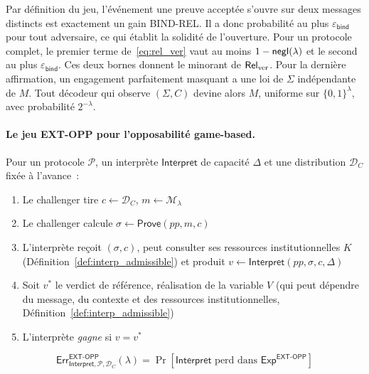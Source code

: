 \begin{sloppypar}
\begin{Preuve}
Par d\'efinition du jeu, l'\'ev\'enement \og une preuve accept\'ee s'ouvre sur deux
messages distincts\fg{} est exactement un gain BIND-REL. Il a donc probabilit\'e
au plus $\varepsilon_{\mathsf{bind}}$ pour tout adversaire, ce qui \'etablit la
solidit\'e de l'ouverture. Pour un protocole complet, le premier terme
de~\eqref{eq:rel_ver} vaut au moins $1 - \mathsf{negl}(\lambda)$ et le second au plus
$\varepsilon_{\mathsf{bind}}$. Ces deux bornes donnent le minorant de $\mathsf{Rel}_{\mathrm{ver}}$. Pour la derni\`ere affirmation, un
engagement parfaitement masquant a une loi de $\Sigma$ ind\'ependante de $M$.
Tout d\'ecodeur qui observe $(\Sigma,C)$ devine alors $M$, uniforme sur
$\{0,1\}^\lambda$, avec probabilit\'e $2^{-\lambda}$.
\end{Preuve}

\paragraph{Le jeu EXT-OPP pour l'opposabilit\'e game-based.}
\label{subsubsubsec:jeu_ext_opp}

\begin{definition}\label{def:jeu_ext_opp}
Pour un protocole $\mathcal{P}$, un interpr\`ete $\mathsf{Interpret}$
de capacit\'e $\Delta$ et une distribution $\mathcal{D}_C$ fix\'ee \`a l'avance~:
\begin{enumerate}
\item Le challenger tire $c \leftarrow \mathcal{D}_C$,
      $m \leftarrow \mathcal{M}_\lambda$
\item Le challenger calcule $\sigma \leftarrow \mathsf{Prove}(pp,m,c)$
\item L'interpr\`ete re\c{c}oit $(\sigma,c)$, peut consulter ses ressources
      institutionnelles $K$ (D\'efinition~\ref{def:interp_admissible}) et produit
      $v \leftarrow \mathsf{Interpret}(pp,\sigma,c,\Delta)$
\item Soit $v^*$ le verdict de r\'ef\'erence, r\'ealisation de la variable $V$
      (qui peut d\'ependre du message, du contexte et des ressources
      institutionnelles, D\'efinition~\ref{def:interp_admissible})
\item L'interpr\`ete \emph{gagne} si $v = v^*$
\end{enumerate}
\begin{equation}
\mathsf{Err}^{\mathsf{EXT\text{-}OPP}}_{\mathsf{Interpret},\mathcal{P},\mathcal{D}_C}(\lambda)
= \Pr\!\left[
\mathsf{Interpret} \text{ perd dans }
\mathsf{Exp}^{\mathsf{EXT\text{-}OPP}}\right]
\end{equation}
\end{definition}


\end{sloppypar}
